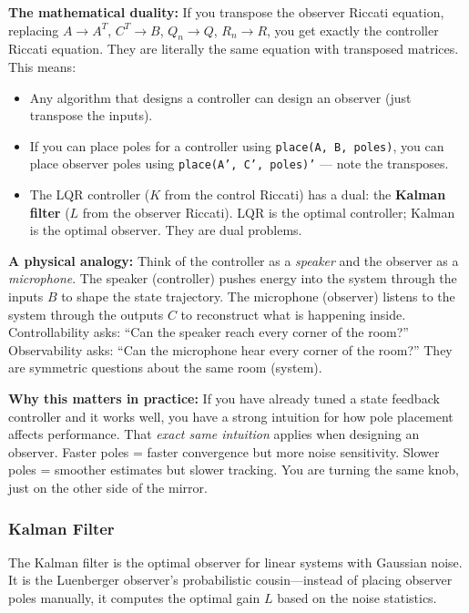 \textbf{The mathematical duality:} If you transpose the observer Riccati equation, replacing $A \to A^T$, $C^T \to B$, $Q_n \to Q$, $R_n \to R$, you get exactly the controller Riccati equation. They are literally the same equation with transposed matrices. This means:

\begin{itemize}
    \item Any algorithm that designs a controller can design an observer (just transpose the inputs).
    \item If you can place poles for a controller using \texttt{place(A, B, poles)}, you can place observer poles using \texttt{place(A', C', poles)'} --- note the transposes.
    \item The LQR controller ($K$ from the control Riccati) has a dual: the \textbf{Kalman filter} ($L$ from the observer Riccati). LQR is the optimal controller; Kalman is the optimal observer. They are dual problems.
\end{itemize}

\textbf{A physical analogy:} Think of the controller as a \textit{speaker} and the observer as a \textit{microphone}. The speaker (controller) pushes energy into the system through the inputs $B$ to shape the state trajectory. The microphone (observer) listens to the system through the outputs $C$ to reconstruct what is happening inside. Controllability asks: ``Can the speaker reach every corner of the room?'' Observability asks: ``Can the microphone hear every corner of the room?'' They are symmetric questions about the same room (system).

\textbf{Why this matters in practice:} If you have already tuned a state feedback controller and it works well, you have a strong intuition for how pole placement affects performance. That \textit{exact same intuition} applies when designing an observer. Faster poles = faster convergence but more noise sensitivity. Slower poles = smoother estimates but slower tracking. You are turning the same knob, just on the other side of the mirror.

\subsubsection{Kalman Filter}

The Kalman filter is the optimal observer for linear systems with Gaussian noise. It is the Luenberger observer's probabilistic cousin---instead of placing observer poles manually, it computes the optimal gain $L$ based on the noise statistics.

